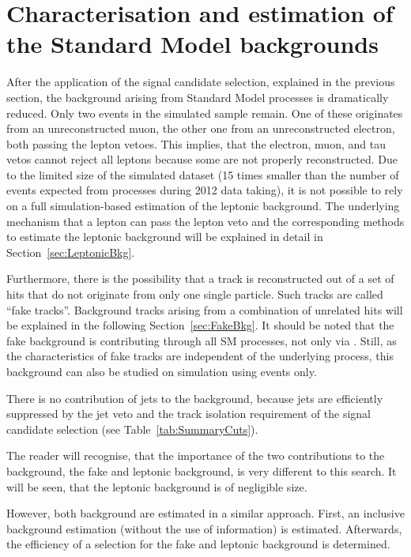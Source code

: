 \FloatBarrier
\chapter{Characterisation and estimation of the Standard Model backgrounds}
\label{ch:BackgroundEstimation}
After the application of the signal candidate selection, explained in the previous section, the background arising from Standard Model processes is dramatically reduced.
Only two events in the simulated \WJets sample remain.
One of these originates from an unreconstructed muon, the other one from an unreconstructed electron, both passing the lepton vetoes.
This implies, that the electron, muon, and tau vetos cannot reject all leptons because some are not properly reconstructed.
Due to the limited size of the simulated \WJets dataset (15 times smaller than the number of events expected from \WJets processes during 2012 data taking), 
it is not possible to rely on a full simulation-based estimation of the leptonic background.
The underlying mechanism that a lepton can pass the lepton veto and the corresponding methods to estimate the leptonic background will be explained in detail in Section~\ref{sec:LeptonicBkg}.

Furthermore, there is the possibility that a track is reconstructed out of a set of hits that do not originate from only one single particle.
Such tracks are called ``fake tracks''. 
Background tracks arising from a combination of unrelated hits will be explained in the following Section~\ref{sec:FakeBkg}.
It should be noted that the fake background is contributing through all SM processes, not only via \WJets.
Still, as the characteristics of fake tracks are independent of the underlying process, this background can also be studied on simulation using \WJets events only.

There is no contribution of jets to the background, because jets are efficiently suppressed by the jet veto and the track isolation requirement of the signal candidate selection (see Table~\ref{tab:SummaryCuts}).

The reader will recognise, that the importance of the two contributions to the background, the fake and leptonic background, is very different to this search.
It will be seen, that the leptonic background is of negligible size.

However, both background are estimated in a similar approach.
First, an inclusive background estimation (without the use of \dedx information) is estimated.
Afterwards, the efficiency of a \dedx selection for the fake and leptonic background is determined.

